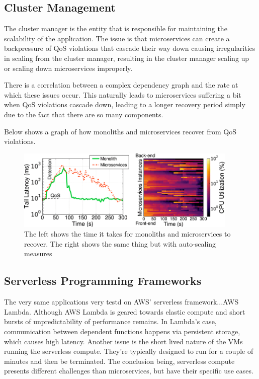 \documentclass[12pt]{report}
\begin{document}
\subsection*{Cluster Management}
The cluster manager is the entity that is responsible for maintaining the scalability of the application. The issue is that microservices can create a backpressure of QoS violations that cascade their way down causing irregularities in scaling from the cluster manager, resulting in the cluster manager scaling up or scaling down microservices improperly. 

There is a  correlation between a complex dependency graph and the rate at which these issues occur. This naturally leads to microservices suffering a bit when QoS violations cascade down, leading to a longer recovery period simply due to the fact that there are so many components.

Below shows a graph of how monoliths and microservices recover from QoS violations.

\begin{figure}[H]
    \centering
    \includegraphics[width=300pt]{images/latency.png}
    \caption{The left shows the time it takes for monoliths and microservices to recover. The right shows the same thing but with auto-scaling measures}
    \label{fig:latency}
\end{figure}

\subsection*{Serverless Programming Frameworks}
The very same applications very testd on AWS' serverless framework...AWS Lambda. Although AWS Lambda is geared towards elastic compute and short bursts of unpredictability of performance remains. In Lambda's case, communication between dependent functions happens via persistent storage, which causes high latency. Another issue is the short lived nature of the VMs running the serverless compute. They're typically designed to run for a couple of minutes and then be terminated. The conclusion being, serverless compute presents different challenges than microservices, but have their specific use cases.
\end{document}
